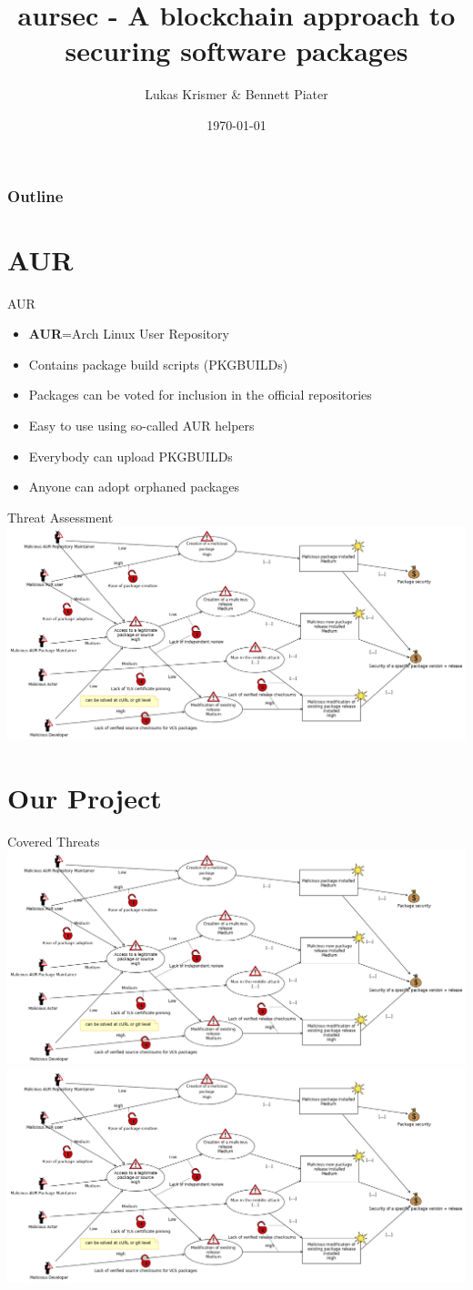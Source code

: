 \documentclass{beamer}
\title{aursec - A blockchain approach to securing software packages}
\author{Lukas Krismer \& Bennett Piater}
\institute{Universität Innsbruck - QE - Christian Sillaber}
\date{\today}
\begin{document}
\maketitle


\begin{frame}
	\frametitle{Outline}
	\tableofcontents
\end{frame}

\section{AUR}

\begin{frame}{AUR}
\begin{itemize}
	\item \textbf{AUR}=\alert{A}rch Linux \alert{U}ser \alert{R}epository
	\item Contains package build scripts (PKGBUILDs)
	\item Packages can be voted for inclusion in the official repositories
	\item Easy to use using so-called AUR helpers
	\item Everybody can upload PKGBUILDs
	\item Anyone can adopt orphaned packages
\end{itemize}
\end{frame}

\begin{frame}{Threat Assessment}
\includegraphics[width=\textwidth]{threat.png}
\end{frame}

\section{Our Project}

\begin{frame}{Covered Threats}
\includegraphics<1>[width=\textwidth]{threat.png}
\includegraphics<2>[width=\textwidth]{threat.png} %
\end{frame}
\end{document}
